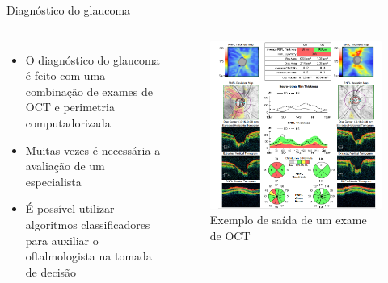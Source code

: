 \documentclass{beamer}
\begin{document}
\begin{frame}{Diagnóstico do glaucoma}
    \begin{columns}
        
        \begin{itemize}
            \item  O  diagnóstico  do  glaucoma  é  feito  com  uma combinação  de  exames de OCT e perimetria  computadorizada
            \item Muitas vezes é necessária a avaliação de um especialista
            \item É possível utilizar algoritmos classificadores para auxiliar o oftalmologista na tomada de decisão
        \end{itemize}    

            \begin{figure}
                \includegraphics[width=\linewidth]{img/oct.png} 
                \caption{Exemplo de saída de um exame de OCT}
            \end{figure}
            
            
    \end{columns}
    
\end{frame}
\end{document}
